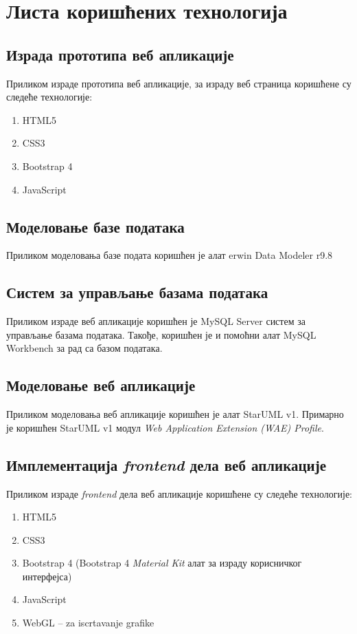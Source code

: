 \section{Листа коришћених технологија}

\subsection{Израда прототипа веб апликације}
Приликом израде прототипа веб апликације, за израду веб страница коришћене су следеће технологије:
\begin{enumerate}
    \item HTML5
    \item CSS3
    \item Bootstrap 4
    \item JavaScript
\end{enumerate}

\subsection{Моделовање базе података}
Приликом моделовања базе подата коришћен је алат
erwin Data Modeler r9.8

\subsection{Систем за управљање базама података}
Приликом израде веб апликације коришћен је MySQL Server
систем за управљање базама података. Такође, коришћен
је и помоћни алат MySQL Workbench за рад са базом података.

\subsection{Моделовање веб апликације}
Приликом моделовања веб апликације коришћен је алат
StarUML v1. Примарно је коришћен StarUML v1 модул
\textit{Web Application Extension (WAE) Profile}.

\subsection{Имплементација \textit{frontend} дела веб апликације}
Приликом израде \textit{frontend} дела веб апликације коришћене
су следеће технологије:
\begin{enumerate}
    \item HTML5
    \item CSS3
    \item Bootstrap 4 (Bootstrap 4 \textit{Material Kit} алат за израду корисничког интерфејса)
    \item JavaScript
    \item WebGL -- za iscrtavanje grafike
\end{enumerate}

